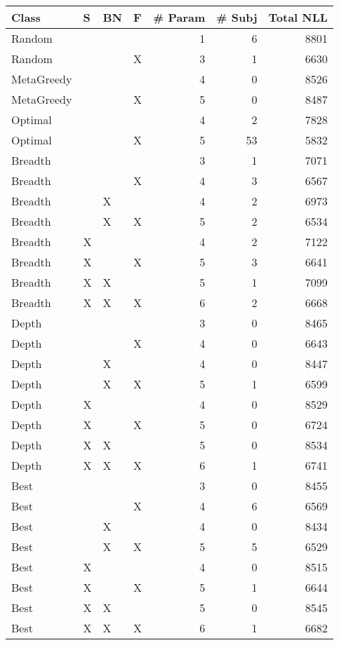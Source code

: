 \begin{tabular}{llllrrr}
\toprule
      Class &  S & BN &  F &  \# Param &  \# Subj &  Total NLL \\
\midrule
     Random &    &    &    &        1 &       6 &       8801 \\
     Random &    &    &  X &        3 &       1 &       6630 \\
 MetaGreedy &    &    &    &        4 &       0 &       8526 \\
 MetaGreedy &    &    &  X &        5 &       0 &       8487 \\
    Optimal &    &    &    &        4 &       2 &       7828 \\
    Optimal &    &    &  X &        5 &      53 &       5832 \\
    Breadth &    &    &    &        3 &       1 &       7071 \\
    Breadth &    &    &  X &        4 &       3 &       6567 \\
    Breadth &    &  X &    &        4 &       2 &       6973 \\
    Breadth &    &  X &  X &        5 &       2 &       6534 \\
    Breadth &  X &    &    &        4 &       2 &       7122 \\
    Breadth &  X &    &  X &        5 &       3 &       6641 \\
    Breadth &  X &  X &    &        5 &       1 &       7099 \\
    Breadth &  X &  X &  X &        6 &       2 &       6668 \\
      Depth &    &    &    &        3 &       0 &       8465 \\
      Depth &    &    &  X &        4 &       0 &       6643 \\
      Depth &    &  X &    &        4 &       0 &       8447 \\
      Depth &    &  X &  X &        5 &       1 &       6599 \\
      Depth &  X &    &    &        4 &       0 &       8529 \\
      Depth &  X &    &  X &        5 &       0 &       6724 \\
      Depth &  X &  X &    &        5 &       0 &       8534 \\
      Depth &  X &  X &  X &        6 &       1 &       6741 \\
       Best &    &    &    &        3 &       0 &       8455 \\
       Best &    &    &  X &        4 &       6 &       6569 \\
       Best &    &  X &    &        4 &       0 &       8434 \\
       Best &    &  X &  X &        5 &       5 &       6529 \\
       Best &  X &    &    &        4 &       0 &       8515 \\
       Best &  X &    &  X &        5 &       1 &       6644 \\
       Best &  X &  X &    &        5 &       0 &       8545 \\
       Best &  X &  X &  X &        6 &       1 &       6682 \\
\bottomrule
\end{tabular}
\unskip